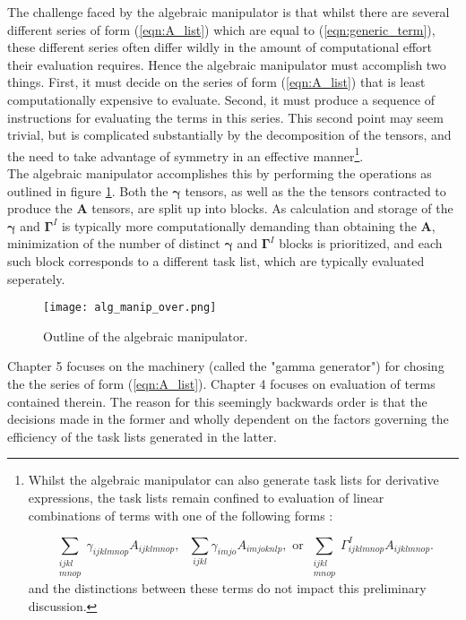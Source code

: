 \noindent The challenge faced by the algebraic manipulator is that whilst there
are several different series of form (\ref{eqn:A_list}) which are equal to
(\ref{eqn:generic_term}), these different series often differ wildly in the
amount of computational effort their evaluation requires. Hence the algebraic
manipulator must accomplish two things. First, it must decide on the series of
form (\ref{eqn:A_list}) that is least computationally expensive to evaluate.
Second, it must produce a sequence of instructions for evaluating the terms in
this series.  This second point may seem trivial, but is complicated
substantially by the decomposition of the tensors, and the need to take
advantage of symmetry in an effective manner\footnote{Whilst the algebraic
manipulator can also generate task lists for derivative expressions, the task
lists remain confined to evaluation of linear combinations of terms with one of
the following forms : 

\begin{equation}
\sum_{\substack{ijkl \\ mnop} }\gamma_{ijklmnop} A_{ijklmnop},
\text{ \ \ \ \ \ \ \ \ }
\sum_{ijkl}\gamma_{imjo} A_{imjoknlp},
\text{ \ \ \ \ or  \ \ \ \ }
\sum_{\substack{ijkl \\ mnop}}\Gamma^{I}_{ijklmnop} A_{ijklmnop}.
\label{eqn:kinds_of_terms}
\end{equation}
\noindent and the distinctions between these terms do not impact this preliminary discussion.}.\\

\noindent The algebraic manipulator accomplishes this by performing the operations as outlined in figure
\ref{fig:alg_manip_overview}. Both the $\mathbf{\gamma}$ tensors, as well as the
the tensors contracted to produce the $\mathbf{A}$ tensors, are split up into blocks. 
As calculation and storage of the $\mathbf{\gamma}$ and $\mathbf{\Gamma}^{I}$ is typically more
computationally demanding than obtaining the $\mathbf{A}$, minimization of the
number of distinct $\mathbf{\gamma}$ and $\mathbf{\Gamma}^{I}$ blocks
is prioritized, and each such block corresponds to a different task list, which
are typically evaluated seperately. \\

\begin{figure}[!ht]
\begin{center}
\texttt{[image: alg\_manip\_over.png]}
\caption{ Outline of the algebraic manipulator. }
\label{fig:alg_manip_overview}
\end{center}
\end{figure}

\noindent Chapter 5 focuses on the machinery (called the "gamma generator") for
chosing the the series of form (\ref{eqn:A_list}). Chapter 4 focuses on
evaluation of terms contained therein. The reason for this seemingly backwards
order is that the decisions made in the former and wholly dependent on the
factors governing the efficiency of the task lists generated in the latter.\\
